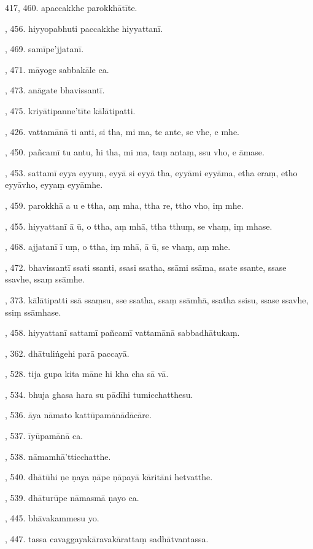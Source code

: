 417, 460. apaccakkhe parokkhātīte.\par {}, 456. hiyyopabhuti paccakkhe hiyyattanī.\par {}, 469. samīpe’jjatanī.\par {}, 471. māyoge sabbakāle ca.\par {}, 473. anāgate bhavissantī.\par {}, 475. kriyātipanne’tīte kālātipatti.\par {}, 426. vattamānā ti anti, si tha, mi ma, te ante, se vhe, e mhe.\par {}, 450. pañcamī tu antu, hi tha, mi ma, taṃ antaṃ, ssu vho, e āmase.\par {}, 453. sattamī eyya eyyuṃ, eyyā si eyyā tha, eyyāmi eyyāma, etha eraṃ, etho eyyāvho, eyyaṃ eyyāmhe.\par {}, 459. parokkhā a u e ttha, aṃ mha, ttha re, ttho vho, iṃ mhe.\par {}, 455. hiyyattanī ā ū, o ttha, aṃ mhā, ttha tthuṃ, se vhaṃ, iṃ mhase.\par {}, 468. ajjatanī ī uṃ, o ttha, iṃ mhā, ā ū, se vhaṃ, aṃ mhe.\par {}, 472. bhavissantī ssati ssanti, ssasi ssatha, ssāmi ssāma, ssate ssante, ssase ssavhe, ssaṃ ssāmhe.\par {}, 373. kālātipatti ssā ssaṃsu, sse ssatha, ssaṃ ssāmhā, ssatha ssisu, ssase ssavhe, ssiṃ ssāmhase.\par {}, 458. hiyyattanī sattamī pañcamī vattamānā sabbadhātukaṃ.\par {}, 362. dhātuliṅgehi parā paccayā.\par {}, 528. tija gupa kita māne hi kha cha sā vā.\par {}, 534. bhuja ghasa hara su pādīhi tumicchatthesu.\par {}, 536. āya nāmato kattūpamānādācāre.\par {}, 537. īyūpamānā ca.\par {}, 538. nāmamhā’tticchatthe.\par {}, 540. dhātūhi ṇe ṇaya ṇāpe ṇāpayā kāritāni hetvatthe.\par {}, 539. dhāturūpe nāmasmā ṇayo ca.\par {}, 445. bhāvakammesu yo.\par {}, 447. tassa cavaggayakāravakārattaṃ sadhātvantassa.\par \noindent
